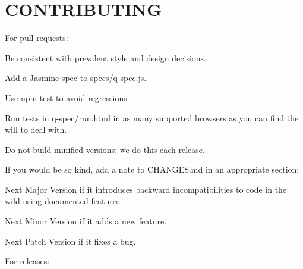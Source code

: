 \chapter{CONTRIBUTING}
\hypertarget{md__c_1_2_users_2_s_t_r_i_d_e_r_2source_2repos_2_ainslie_a_p_i_2wwwroot_2lib_2jquery-ui_2node__m9d0075dd91359ce21bd79f2f462f622b}{}\label{md__c_1_2_users_2_s_t_r_i_d_e_r_2source_2repos_2_ainslie_a_p_i_2wwwroot_2lib_2jquery-ui_2node__m9d0075dd91359ce21bd79f2f462f622b}
For pull requests\+:


\begin{DoxyItemize}
\item Be consistent with prevalent style and design decisions.
\item Add a Jasmine spec to {\ttfamily specs/q-\/spec.\+js}.
\item Use {\ttfamily npm test} to avoid regressions.
\item Run tests in {\ttfamily q-\/spec/run.\+html} in as many supported browsers as you can find the will to deal with.
\item Do not build minified versions; we do this each release.
\item If you would be so kind, add a note to {\ttfamily CHANGES.\+md} in an appropriate section\+:
\begin{DoxyItemize}
\item {\ttfamily Next Major Version} if it introduces backward incompatibilities to code in the wild using documented features.
\item {\ttfamily Next Minor Version} if it adds a new feature.
\item {\ttfamily Next Patch Version} if it fixes a bug.
\end{DoxyItemize}
\end{DoxyItemize}

For releases\+:


